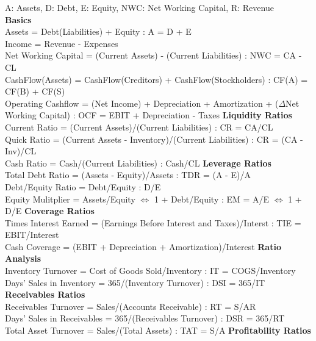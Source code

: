 \documentclass{article}
\begin{document}
A: Assets, D: Debt, E: Equity, NWC: Net Working Capital, R: Revenue \\
\textbf{Basics} \\
Assets = Debt(Liabilities) + Equity : A = D + E \\
Income = Revenue - Expenses \\
Net Working Capital = (Current Assets) - (Current Liabilities) : NWC = CA - CL \\
CashFlow(Assets) = CashFlow(Creditors) + CashFlow(Stockholders) : CF(A) = CF(B) + CF(S) \\
Operating Cashflow = (Net Income) + Depreciation + Amortization + ($\Delta$Net Working Capital) : OCF = EBIT + Depreciation - Taxes
\newline
\textbf{Liquidity Ratios} \\
Current Ratio = (Current Assets)/(Current Liabilities) : CR = CA/CL \\
Quick Ratio = (Current Assets - Inventory)/(Current Liabilities) : CR = (CA - Inv)/CL \\
Cash Ratio = Cash/(Current Liabilities) : Cash/CL
\newline
\textbf{Leverage Ratios} \\
Total Debt Ratio = (Assets - Equity)/Assets : TDR = (A - E)/A \\
Debt/Equity Ratio = Debt/Equity : D/E \\
Equity Mulitplier = Assets/Equity $\iff$ 1 + Debt/Equity : EM = A/E $\iff$ 1 + D/E
\newline
\textbf{Coverage Ratios} \\
Times Interest Earned = (Earnings Before Interest and Taxes)/Interst : TIE = EBIT/Interest \\
Cash Coverage = (EBIT + Depreciation + Amortization)/Interest
\newline
\textbf{Ratio Analysis} \\
Inventory Turnover = Cost of Goods Sold/Inventory : IT = COGS/Inventory \\
Days' Sales in Inventory = 365/(Inventory Turnover) : DSI = 365/IT
\newline
\textbf{Receivables Ratios} \\
Receivables Turnover = Sales/(Accounts Receivable) : RT = S/AR \\
Days' Sales in Receivables = 365/(Receivables Turnover) : DSR = 365/RT \\
Total Asset Turnover = Sales/(Total Assets) : TAT = S/A
\newline
\textbf{Profitability Ratios} \\
\end{document}
